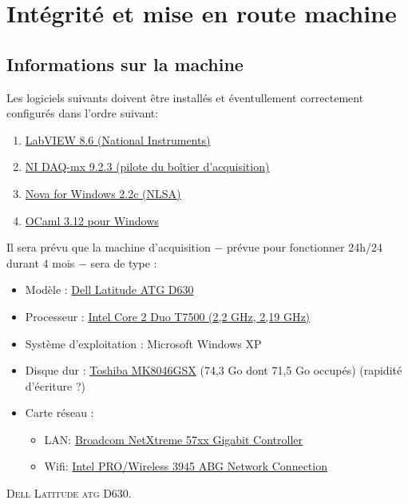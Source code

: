 \documentclass[twocolumn,pre,floats,aps,amsmath,amssymb]{revtex4}
\begin{document}
\section{Int\'egrit\'e et mise en route machine}

\subsection{Informations sur la machine}

Les logiciels suivants doivent \^etre install\'es et \'eventullement correctement configur\'es dans l'ordre\cite{NI_driver} suivant:
\begin{enumerate}
  \item{\href{http://digital.ni.com/src.nsf/websearch/968B3DF8AD48394D86257880005141A8?OpenDocument&node=node=203014_us}{LabVIEW 8.6 (National Instruments)}}
  \item{\href{http://joule.ni.com/nidu/cds/view/p/id/2260/lang/fr}{NI DAQ-mx 9.2.3 (pilote du bo\^itier d'acquisition)}}
  \item{\href{http://www.nlsa.com/uploads/nfw21v/nova_21v_download.html}{Nova for Windows 2.2c (NLSA)}}
  \item{\href{http://protz.github.com/ocaml-installer/}{OCaml 3.12 pour Windows}}
\end{enumerate}

Il sera pr\'evu que la machine d'acquisition $-$ pr\'evue pour fonctionner 24h/24 durant 4 mois $-$ sera de type :
\begin{itemize}
  \item{Mod\`ele : \href{http://support.dell.com/support/edocs/systems/latd630a/en/sm/index.htm}{Dell Latitude ATG D630}}
  \item{Processeur : \href{http://ark.intel.com/products/29761/Intel-Core2-Duo-Processor-T7500-\%284M-Cache-2_20-GHz-800-MHz-FSB\%29}{Intel Core 2 Duo T7500 (2,2 GHz, 2,19 GHz)}}
  \item{Syst\`eme d'exploitation : Microsoft Windows XP}
  \item{Disque dur : \href{http://storage.toshiba.com/storagesolutions/archived-models/mk8046gsx}{Toshiba MK8046GSX} (74,3 Go dont 71,5 Go occup\'es) (rapidit\'e d'\'ecriture ?)}
  \item{Carte r\'eseau :
    \begin{itemize}
      \item{LAN: \href{http://www.broadcom.com/support/ethernet_nic/netlink_k57.php}{Broadcom NetXtreme 57xx Gigabit Controller}}
      \item{Wifi: \href{http://www.intel.com/products/wireless/prowireless_mobile.htm}{Intel PRO/Wireless 3945 ABG Network Connection}}
    \end{itemize}
  }
\end{itemize}
\textsc{Dell Latitude atg D630}.
\end{document}
